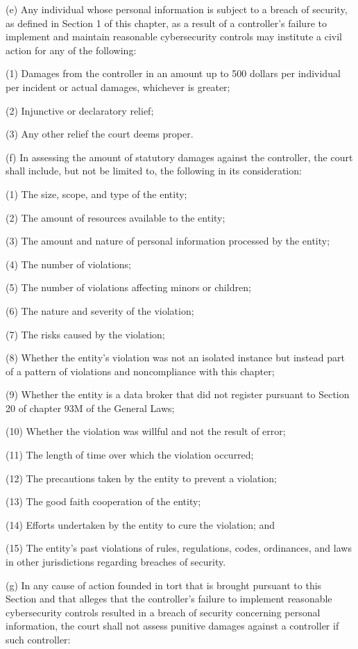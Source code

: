 (e) Any individual whose personal information is subject to a breach of security, as defined in Section 1 of this chapter, as a result of a controller’s failure to implement and maintain reasonable cybersecurity controls may institute a civil action for any of the following:

(1) Damages from the controller in an amount up to 500 dollars per individual per incident or actual damages, whichever is greater;

(2) Injunctive or declaratory relief;

(3) Any other relief the court deems proper.

(f) In assessing the amount of statutory damages against the controller, the court shall include, but not be limited to, the following in its consideration:

(1) The size, scope, and type of the entity;

(2) The amount of resources available to the entity;

(3) The amount and nature of personal information processed by the entity;

(4) The number of violations;

(5) The number of violations affecting minors or children; 

(6) The nature and severity of the violation; 

(7) The risks caused by the violation;

(8) Whether the entity’s violation was not an isolated instance but instead part of a pattern of violations and noncompliance with this chapter;

(9) Whether the entity is a data broker that did not register pursuant to Section 20 of chapter 93M of the General Laws;

(10) Whether the violation was willful and not the result of error;

(11) The length of time over which the violation occurred;

(12) The precautions taken by the entity to prevent a violation;

(13) The good faith cooperation of the entity;

(14) Efforts undertaken by the entity to cure the violation; and    

(15) The entity’s past violations of rules, regulations, codes, ordinances, and laws in other jurisdictions regarding breaches of security.

(g) In any cause of action founded in tort that is brought pursuant to this Section and that alleges that the controller’s failure to implement reasonable cybersecurity controls resulted in a breach of security concerning personal information, the court shall not assess punitive damages against a controller if such controller:

